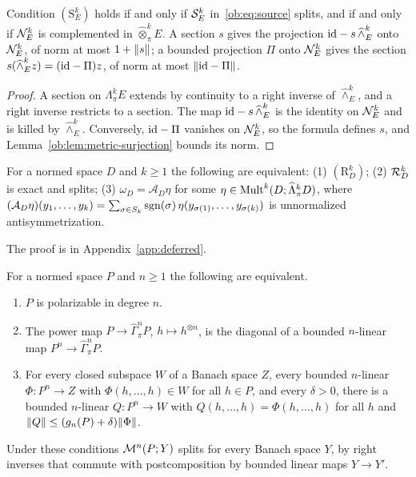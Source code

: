 \begin{lemma}\label{ob:lem:source}
Condition $(\mathrm S^k_E)$ holds if and only if $\mathcal S^k_E$ in~\eqref{ob:eq:source} splits, and if and only if $\mathcal N^k_E$ is complemented in
$\widehat\otimes^k_\pi E$. A section $s$ gives the projection $\mathrm{id}-s\,\widehat\wedge^k_E$ onto $\mathcal N^k_E$, of norm at most
$1+\lVert s\rVert$; a bounded projection $\Pi$ onto $\mathcal N^k_E$ gives the section $s(\widehat\wedge^k_Ez)=(\mathrm{id}-\Pi)z$, of norm at
most $\lVert \mathrm{id}-\Pi\rVert$.
\end{lemma}

\begin{proof}
A section on $\Lambda^k_\pi E$ extends by continuity to a right inverse of $\widehat\wedge^k_E$, and a right inverse
restricts to a section. The map $\mathrm{id}-s\,\widehat\wedge^k_E$ is the identity on $\mathcal N^k_E$ and is killed by
$\widehat\wedge^k_E$. Conversely, $\mathrm{id}-\Pi$ vanishes on $\mathcal N^k_E$, so the formula defines $s$, and
Lemma~\ref{ob:lem:metric-surjection} bounds its norm.
\end{proof}

\begin{lemma}\label{ob:lem:target}
For a normed space $D$ and $k\ge1$ the following are equivalent: \textup{(1)} $(\mathrm R^k_D)$; \textup{(2)} $\mathcal R^k_D$ is
exact and splits; \textup{(3)} $\omega_D=\mathcal A_D\eta$ for some $\eta\in\operatorname{Mult}^k(D;\widehat\Lambda^k_\pi D)$, where
$(\mathcal A_D\eta)(y_1,\dots,y_k)=\sum_{\sigma\in S_k}\operatorname{sgn}(\sigma)\,\eta(y_{\sigma(1)},\dots,y_{\sigma(k)})$ is
unnormalized antisymmetrization.
\end{lemma}

The proof is in Appendix~\ref{app:deferred}.

\begin{lemma}\label{ob:lem:parameter}
For a normed space $P$ and $n\ge1$ the following are equivalent.
\begin{enumerate}
\item $P$ is polarizable in degree $n$.
\item The power map $P\to\widehat\Gamma^n_\pi P$, $h\mapsto h^{\otimes n}$, is the diagonal of a bounded $n$-linear map
$P^n\to\widehat\Gamma^n_\pi P$.
\item For every closed subspace $W$ of a Banach space $Z$, every bounded $n$-linear $\Phi\colon P^n\to Z$ with
$\Phi(h,\dots,h)\in W$ for all $h\in P$, and every $\delta>0$, there is a bounded $n$-linear $Q\colon P^n\to W$ with
$Q(h,\dots,h)=\Phi(h,\dots,h)$ for all $h$ and $\lVert Q\rVert\le(g_n(P)+\delta)\lVert \Phi\rVert$.
\end{enumerate}
Under these conditions $\mathcal M^n(P;Y)$ splits for every Banach space $Y$, by right inverses that commute with postcomposition
by bounded linear maps $Y\to Y'$.
\end{lemma}

